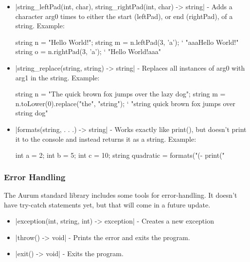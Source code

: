 \documentclass[12pt, letterpaper, oneside]{article}
\begin{document}
\begin{itemize}
		
		\begin{spverbatim}
			string n = "The quick brown fox jumps over the lazy dog";
			string[] a = n.eqSplit(5); ` ["The quic", "k brown ", "fox jump", "s over t", "he lazy ", "dog"]; 5 equal parts, and leftover characters.
			string[] b = n.nSplit(5); ` ["The q", "uick ", "brown", " fox ", "jumps", " over", " the " "lazy " "dog"]; Parts whose length is 5, and leftover characters.
		\end{spverbatim}
		\item[--] \spverb|string_leftPad(int, char), string_rightPad(int, char) -> string| - Adds a character arg0 times to either the start (leftPad), or end (rightPad), of a string. Example:
		
		\begin{spverbatim}
			string n = "Hello World!";
			string m = n.leftPad(3, 'a'); ` "aaaHello World!"
			string o = n.rightPad(3, 'a'); ` "Hello World!aaa"
		\end{spverbatim}
		\item[--] \spverb|string_replace(string, string) -> string| - Replaces all instances of arg0 with arg1 in the string. Example:
		
		\begin{spverbatim}
			string n = "The quick brown fox jumps over the lazy dog";
			string m = n.toLower(0).replace("the", "string"); ` "string quick brown fox jumps over string dog"
		\end{spverbatim}
		\item[--] \spverb|formats(string, . . .) -> string| - Works exactly like print(), but doesn't print it to the console and instead returns it as a string. \newline Example:
		
		\begin{spverbatim}
			int a = 2;
			int b = 5;
			int c = 10;
			string quadratic = formats("(-%
			print("\n%
		\end{spverbatim}
	\end{itemize}
	\subsubsection{Error Handling}
		The Aurum standard library includes some tools for error-handling. It doesn't have try-catch statements yet, but that will come in a future update.
		\begin{itemize}
			\item[--] \spverb|exception(int, string, int) -> exception| - Creates a new exception
			\item[--] \spverb|throw() -> void| - Prints the error and exits the program.
			\item[--] \spverb|exit() -> void| - Exits the program. 
		\end{itemize}
		\newpage
\end{document}
